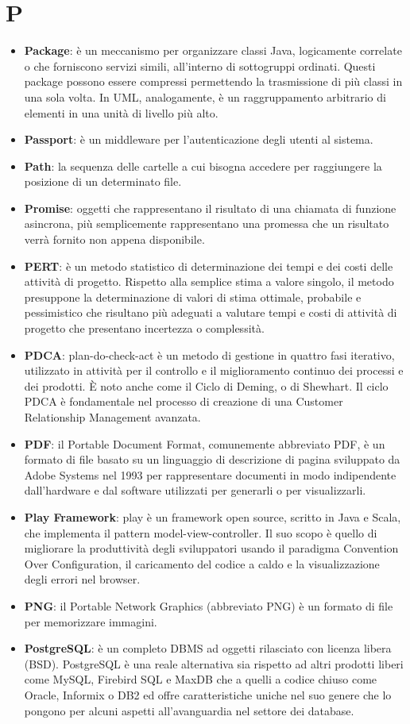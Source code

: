 \section{P}
\begin{itemize} 
	\item
	\textbf{Package}: è un meccanismo per organizzare classi Java, logicamente correlate o che forniscono servizi simili, all’interno di sottogruppi ordinati. Questi package possono essere compressi permettendo la trasmissione di più classi in una sola volta.
	In UML, analogamente, è un raggruppamento arbitrario di elementi in una unità di livello più alto.
	\item
	\textbf{Passport}: è un middleware per l'autenticazione degli utenti al sistema.
	\item
	\textbf{Path}: la sequenza delle cartelle a cui bisogna accedere per raggiungere la posizione di un determinato file.
	\item
	\textbf{Promise}: oggetti che rappresentano il risultato di una chiamata di funzione asincrona, più semplicemente rappresentano una promessa che un risultato verrà fornito non appena disponibile.
	\item
	\textbf{PERT}: è un metodo statistico di determinazione dei tempi e dei costi delle attività di progetto. Rispetto alla semplice stima a valore singolo, il metodo presuppone la determinazione di valori di stima ottimale, probabile e pessimistico che risultano più adeguati a valutare tempi e costi di attività di progetto che presentano incertezza o complessità.
	\item
	\textbf{PDCA}: plan-do-check-act è un metodo di gestione in quattro fasi iterativo, utilizzato in attività per il controllo e il miglioramento continuo dei processi e dei prodotti. È noto anche come il Ciclo di Deming, o di Shewhart. Il ciclo PDCA è fondamentale nel processo di creazione di una Customer Relationship Management avanzata. 
	\item
	\textbf{PDF}: il Portable Document Format, comunemente abbreviato PDF, è un formato di file basato su un linguaggio di descrizione di pagina sviluppato da Adobe Systems nel 1993 per rappresentare documenti in modo indipendente dall’hardware e dal software utilizzati per generarli o per visualizzarli.
	\item
	\textbf{Play Framework}: play è un framework open source, scritto in Java e Scala, che implementa il pattern model-view-controller. Il suo scopo è quello di migliorare la produttività degli sviluppatori usando il paradigma Convention Over Configuration, il caricamento del codice a caldo e la visualizzazione degli errori nel browser.
	\item
	\textbf{PNG}: il Portable Network Graphics (abbreviato PNG) è un formato di file per memorizzare immagini.
	\item
	\textbf{PostgreSQL}: è un completo DBMS ad oggetti rilasciato con licenza libera (BSD).
	PostgreSQL è una reale alternativa sia rispetto ad altri prodotti liberi come MySQL, Firebird SQL e MaxDB che a quelli a codice chiuso come Oracle, Informix o DB2 ed offre caratteristiche uniche nel suo genere che lo pongono per alcuni aspetti all'avanguardia nel settore dei database.
\end{itemize}

